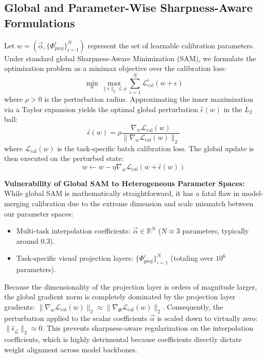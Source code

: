 \documentclass{article}
\theoremstyle{plain}
\theoremstyle{definition}
\theoremstyle{remark}
\begin{document}
\subsection{Global and Parameter-Wise Sharpness-Aware Formulations}
Let $w = (\vec{\alpha}, \{\Phi_{\text{proj}}^i\}_{i=1}^N)$ represent the set of learnable calibration parameters. Under standard global Sharpness-Aware Minimization (SAM), we formulate the optimization problem as a minimax objective over the calibration loss:
\begin{equation}
    \min_{w} \max_{\|\epsilon\|_2 \le \rho} \sum_{i=1}^N \mathcal{L}_{\text{cal}}^i(w + \epsilon)
\end{equation}
where $\rho > 0$ is the perturbation radius. Approximating the inner maximization via a Taylor expansion yields the optimal global perturbation $\hat{\epsilon}(w)$ in the $L_2$ ball:
\begin{equation}
    \hat{\epsilon}(w) = \rho \frac{\nabla_w \mathcal{L}_{\text{cal}}(w)}{\|\nabla_w \mathcal{L}_{\text{cal}}(w)\|_2}
\end{equation}
where $\mathcal{L}_{\text{cal}}(w)$ is the task-specific batch calibration loss. The global update is then executed on the perturbed state:
\begin{equation}
    w \leftarrow w - \eta \nabla_w \mathcal{L}_{\text{cal}}(w + \hat{\epsilon}(w))
\end{equation}

\textbf{Vulnerability of Global SAM to Heterogeneous Parameter Spaces:} 
While global SAM is mathematically straightforward, it has a fatal flaw in model-merging calibration due to the extreme dimension and scale mismatch between our parameter spaces:
\begin{itemize}
    \item Multi-task interpolation coefficients: $\vec{\alpha} \in \mathbb{R}^N$ ($N \approx 3$ parameters, typically around $0.3$).
    \item Task-specific visual projection layers: $\{\Phi_{\text{proj}}^i\}_{i=1}^N$ (totaling over $10^6$ parameters).
\end{itemize}
Because the dimensionality of the projection layer is orders of magnitude larger, the global gradient norm is completely dominated by the projection layer gradients: $\|\nabla_w \mathcal{L}_{\text{cal}}(w)\|_2 \approx \|\nabla_{\Phi} \mathcal{L}_{\text{cal}}(w)\|_2$. Consequently, the perturbation applied to the scalar coefficients $\vec{\alpha}$ is scaled down to virtually zero: $\|\hat{\epsilon}_{\vec{\alpha}}\|_2 \approx 0$. This prevents sharpness-aware regularization on the interpolation coefficients, which is highly detrimental because coefficients directly dictate weight alignment across model backbones.
\end{document}
